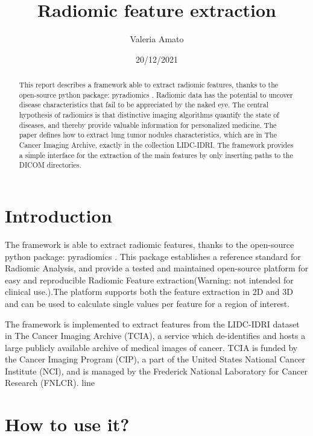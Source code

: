 \documentclass[12pt]{article}
\begin{document}
	\title {Radiomic feature extraction}
	\author {Valeria Amato}
	\date{20/12/2021}

	\maketitle

	\begin{abstract}
This report describes a framework able to extract radiomic features, thanks to the open-source python package: pyradiomics \cite{pyradiomics}.
Radiomic data has the potential to uncover disease characteristics that fail to be appreciated by the naked eye.
The central hypothesis of radiomics is that distinctive imaging algorithms quantify the state of diseases, and thereby provide valuable information for personalized medicine. 
The paper defines how to extract lung tumor nodules characteristics, which are in The Cancer Imaging Archive, exactly in the collection LIDC-IDRI.
The framework provides a simple interface for the extraction of the main features by only inserting paths to the DICOM directories.
	\end{abstract}

	\section{Introduction}\label{sec:intro}
The framework is able to extract radiomic features, thanks to the open-source python package: pyradiomics \cite{pyradiomics}. 
This package establishes a reference standard for Radiomic Analysis, and provide a tested and maintained open-source platform for easy and reproducible Radiomic Feature extraction(Warning: not intended for clinical use.).The platform supports both the feature extraction in 2D and 3D and can be used to calculate single values per feature for a region of interest.

The framework is implemented to extract features from the LIDC-IDRI dataset in The Cancer Imaging Archive (TCIA), a service which de-identifies and hosts a large publicly available archive of medical images of cancer.  TCIA is funded by the Cancer Imaging Program (CIP), a part of the United States  National Cancer Institute (NCI), and is managed by the Frederick National Laboratory for Cancer Research (FNLCR).
line

	\pagebreak
	\section{How to use it?}\label{sec:use}
\end{document}
